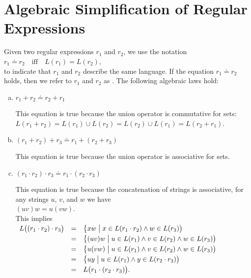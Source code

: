 \section{Algebraic Simplification of Regular Expressions}
Given two regular expressions $r_1$ and $r_2$, we use the notation
\\[0.2cm]
\hspace*{1.3cm}
$r_1 \doteq r_2 \quad \text{iff} \quad L(r_1) = L(r_2)$, \index{$\doteq$}
\\[0.2cm]
to indicate that $ r_1 $ and $ r_2 $ describe the same language. If the equation $ r_1 \doteq r_2 $
holds, then we refer to $ r_1 $ and $ r_2 $ as . The
following algebraic laws hold: 
\begin{enumerate}[(a)]
\item $r_1 + r_2 \doteq r_2 + r_1$

      This equation is true because the union operator is commutative for sets:
      \\[0.2cm]
      \hspace*{1.3cm}
      $L(r_1 + r_2) = L(r_1) \cup L(r_2) = L(r_2) \cup L(r_1) = L(r_2 + r_1)$.
\item $(r_1 + r_2) + r_3 \doteq r_1 + (r_2 + r_3)$

      This equation is true because the union operator is associative for sets.
\item $(r_1 \cdot r_2) \cdot r_3 \doteq r_1 \cdot (r_2 \cdot r_3)$

      This equation is true because the concatenation of strings is associative, for any strings
      $u$, $v$, and $w$ we have
      \\[0.2cm]
      \hspace*{1.3cm}
      $(u v) w = u (v w)$.
      \\[0.2cm]
      This implies
      \\[0.2cm]
      \hspace*{1.3cm}
      $
      \begin{array}[t]{lcl}
        L\bigl( (r_1 \cdot r_2) \cdot r_3\bigr) 
        & = & \bigl\{ x w \bigm| x \in L(r_1 \cdot r_2) \wedge w \in L(r_3)\bigr) \\[0.1cm]
        & = & \bigl\{ (u v) w \bigm| u \in L(r_1) \wedge v \in L(r_2) \wedge w \in L(r_3)\bigr) \\[0.1cm]
        & = & \bigl\{ u (v w) \bigm| u \in L(r_1) \wedge v \in L(r_2) \wedge w \in L(r_3)\bigr) \\[0.1cm]
        & = & \bigl\{ u y \bigm| u \in L(r_1) \wedge y \in L(r_2 \cdot r_3)\bigr) \\[0.1cm]
        & = & L\bigl( r_1 \cdot (r_2 \cdot r_3)\bigr).
      \end{array}
      $


\end{enumerate}
